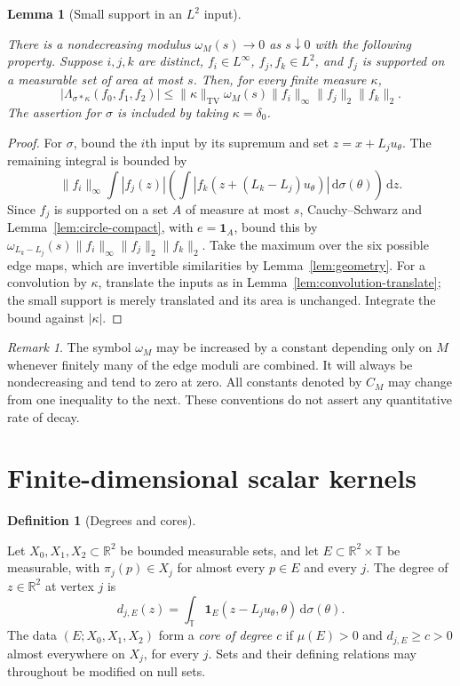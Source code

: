 \documentclass[11pt]{amsart}
\newcommand{\R}{\mathbb R}
\newcommand{\dd}{\,\mathrm d}
\newcommand{\one}{\mathbf 1}
\DeclareMathOperator{\TV}{TV}
\newtheorem{lemma}[theorem]{Lemma}
\theoremstyle{definition}
\newtheorem{definition}[theorem]{Definition}
\theoremstyle{remark}
\newtheorem{remark}[theorem]{Remark}
\numberwithin{equation}{section}
\providecommand{\lean}[1]{}
\providecommand{\leanok}{}
\begin{document}
\begin{lemma}[Small support in an $L^2$ input]\label{lem:small-support}
\lean{Auto.lem_small_support}
\leanok
There is a nondecreasing modulus $\omega_M(s)\to0$ as
$s\downarrow0$ with the following property.  Suppose $i,j,k$
are distinct, $f_i\in L^\infty$, $f_j,f_k\in L^2$, and
$f_j$ is supported on a measurable set of area at most $s$.
Then, for every finite measure $\kappa$,
\[
 |\Lambda_{\sigma*\kappa}(f_0,f_1,f_2)|
 \le\|\kappa\|_{\TV}\omega_M(s)
              \|f_i\|_\infty\|f_j\|_2\|f_k\|_2.
\]
The assertion for $\sigma$ is included by taking
$\kappa=\delta_0$.
\end{lemma}
\begin{proof}
For $\sigma$, bound the $i$th input by its supremum and set
$z=x+L_ju_\theta$.  The remaining integral is bounded by
\[
 \|f_i\|_\infty\int |f_j(z)|
   \left(\int |f_k(z+(L_k-L_j)u_\theta)|
                          \dd\sigma(\theta)\right)\dd z.
\]
Since $f_j$ is supported on a set $A$ of measure at most $s$,
Cauchy--Schwarz and Lemma~\ref{lem:circle-compact}, with
$e=\one_A$, bound this by
$\omega_{L_k-L_j}(s)\|f_i\|_\infty\|f_j\|_2\|f_k\|_2$.
Take the maximum over the six possible edge maps, which are
invertible similarities by Lemma~\ref{lem:geometry}.  For a
convolution by $\kappa$, translate the inputs as in
Lemma~\ref{lem:convolution-translate}; the small support is
merely translated and its area is unchanged.  Integrate the
bound against $|\kappa|$.
\end{proof}

\begin{remark}\label{rem:moduli}
The symbol $\omega_M$ may be increased by a constant depending
only on $M$ whenever finitely many of the edge moduli are
combined.  It will always be nondecreasing and tend to zero
at zero.  All constants denoted by $C_M$ may change from one
inequality to the next.  These conventions do not assert any
quantitative rate of decay.
\end{remark}


\section{Finite-dimensional scalar kernels}

\begin{definition}[Degrees and cores]\label{rig:def-core}
\lean{Auto.degree,Auto.IsCoreData,Auto.IsCore}
Let $X_0,X_1,X_2\subset\R^2$ be bounded measurable sets, and let
$E\subset\R^2\times \mathbb T$ be measurable, with
$\pi_j(p)\in X_j$ for almost every $p\in E$ and every $j$.
The degree of $z\in\R^2$ at vertex $j$ is
\[
 d_{j,E}(z)=\int_{\mathbb T}
 \one_E(z-L_ju_\theta,\theta)\dd\sigma(\theta).
\]
The data $(E;X_0,X_1,X_2)$ form a \emph{core of degree $c$} if
$\mu(E)>0$ and $d_{j,E}\ge c>0$ almost everywhere on $X_j$, for every $j$.
Sets and their defining relations may throughout be modified on null sets.
\end{definition}
\end{document}
